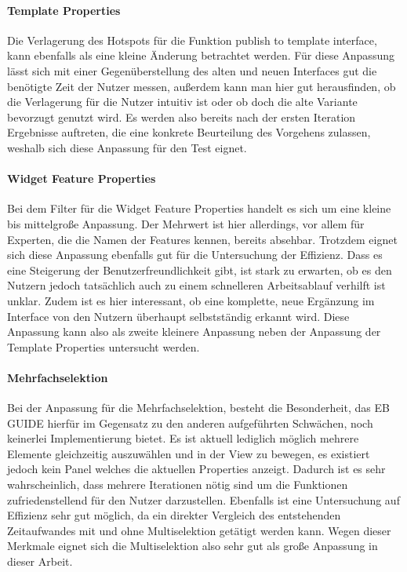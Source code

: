 \paragraph{Template Properties}
Die Verlagerung des Hotspots für die Funktion \glqq publish to template interface\grqq{}, kann ebenfalls als eine kleine Änderung betrachtet werden.
Für diese Anpassung lässt sich mit einer Gegenüberstellung des alten und neuen Interfaces gut die benötigte Zeit der Nutzer messen, außerdem kann man hier gut herausfinden, ob die Verlagerung für die Nutzer intuitiv ist oder ob doch die alte Variante bevorzugt genutzt wird.
Es werden also bereits nach der ersten Iteration Ergebnisse auftreten, die eine konkrete Beurteilung des Vorgehens zulassen, weshalb sich diese Anpassung für den Test eignet.

\paragraph{Widget Feature Properties}
Bei dem Filter für die Widget Feature Properties handelt es sich um eine kleine bis mittelgroße Anpassung.
Der Mehrwert ist hier allerdings, vor allem für Experten, die die Namen der Features kennen, bereits absehbar.
Trotzdem eignet sich diese Anpassung ebenfalls gut für die Untersuchung der Effizienz.
Dass es eine Steigerung der Benutzerfreundlichkeit gibt, ist stark zu erwarten, ob es den Nutzern jedoch tatsächlich auch zu einem schnelleren Arbeitsablauf verhilft ist unklar.
Zudem ist es hier interessant, ob eine komplette, neue Ergänzung im Interface von den Nutzern überhaupt selbstständig erkannt wird.
Diese Anpassung kann also als zweite kleinere Anpassung neben der Anpassung der Template Properties untersucht werden.

\paragraph{Mehrfachselektion}
Bei der Anpassung für die Mehrfachselektion, besteht die Besonderheit, das EB GUIDE hierfür im Gegensatz zu den anderen aufgeführten Schwächen, noch keinerlei Implementierung bietet.
Es ist aktuell lediglich möglich mehrere Elemente gleichzeitig auszuwählen und in der View zu bewegen, es existiert jedoch kein Panel welches die aktuellen Properties anzeigt.
Dadurch ist es sehr wahrscheinlich, dass mehrere Iterationen nötig sind um die Funktionen zufriedenstellend für den Nutzer darzustellen.
Ebenfalls ist eine Untersuchung auf Effizienz sehr gut möglich, da ein direkter Vergleich des entstehenden Zeitaufwandes mit und ohne Multiselektion getätigt werden kann.
Wegen dieser Merkmale eignet sich die Multiselektion also sehr gut als große Anpassung in dieser Arbeit.

